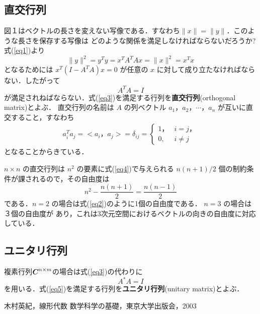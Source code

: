 \documentclass[a4paper,12pt]{jarticle}
\newcommand{\vect}[1]{\mbox{\boldmath${#1}$}}
\begin{document}
\subsection{直交行列}
図１はベクトルの長さを変えない写像である．すなわち$\|x\|=\|y\|$．このような長さを保存する写像は
どのような関係を満足しなければならないだろうか? 式(\ref{eq1})より
$$ \|y\|^2 = y^Ty = x^TA^TAx = \|x\|^2 = x^Tx $$
となるためには $x^T(I-A^TA)x=0$ が任意の $x$ に対して成り立たなければならない．したがって
\begin{equation}
    A^TA = I
    \label{eq3}
\end{equation}
が満足されねばならない．式(\ref{eq3})を満足する行列を\textbf{直交行列}(orthogonal matrix)とよぶ．
直交行列の名前は $A$ の列ベクトル $a_1，a_2，\cdots，a_n$ が互いに直交すること，すなわち
\begin{eqnarray}
    a_i^Ta_j =< a_i，a_j >= \delta_{ij} = \left\{\begin{array}{ll}1，& i=j，\\0, & i\neq j \end{array}\right.
    \label{eq4}
\end{eqnarray}
となることからきている．
\par $n \times n$ の直交行列は $n^2$ の要素に式(\ref{eq4})で与えられる $n(n+1)/2$ 個の制約条件が課されるので，その自由度は
$$ n^2-\frac{n(n+1)}{2}=\frac{n(n-1)}{2} $$
である．$n=2$ の場合は式(\ref{eq2})のように1個の自由度である． $n=3$ の場合は３個の自由度が
あり，これは3次元空間におけるベクトルの向きの自由度に対応している．
\subsection{ユニタリ行列}
複素行列$\vect{C}^{n \times m}$の場合は式(\ref{eq3})の代わりに
\begin{equation}
    A^\ast A=I
    \label{eq5}
\end{equation}
を用いる．式(\ref{eq5})を満足する行列を\textbf{ユニタリ行列}(unitary matrix)とよぶ．


\begin{thebibliography}{9}
    木村英紀，線形代数 数学科学の基礎，東京大学出版会，2003
\end{thebibliography}
\end{document}
